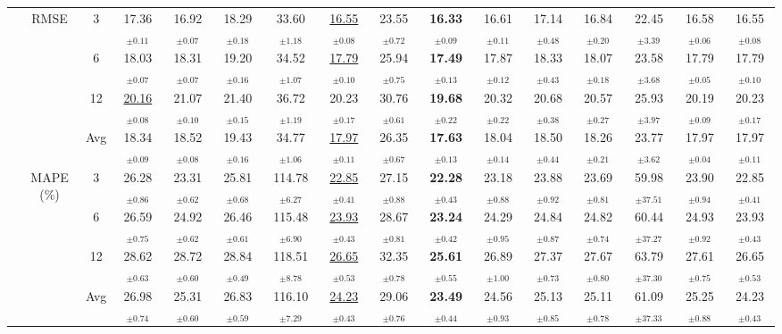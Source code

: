 \begin{table}[t]
{\begin{tabular}{ccc|ccc|cccc|cccc|cc}
\cmidrule(lr){2-16}
 & \multirow{4}{*}{RMSE} & 3 & 17.36$_{\pm0.11}$ & 16.92$_{\pm0.07}$ & 18.29$_{\pm0.18}$ & 33.60$_{\pm1.18}$ & \underline{16.55$_{\pm0.08}$} & 23.55$_{\pm0.72}$ & \textbf{16.33$_{\pm0.09}$} & 16.61$_{\pm0.11}$ & 17.14$_{\pm0.48}$ & 16.84$_{\pm0.20}$ & 22.45$_{\pm3.39}$ & 16.58$_{\pm0.06}$ & 16.55$_{\pm0.08}$ \\
 &  & 6 & 18.03$_{\pm0.07}$ & 18.31$_{\pm0.07}$ & 19.20$_{\pm0.16}$ & 34.52$_{\pm1.07}$ & \underline{17.79$_{\pm0.10}$} & 25.94$_{\pm0.75}$ & \textbf{17.49$_{\pm0.13}$} & 17.87$_{\pm0.12}$ & 18.33$_{\pm0.43}$ & 18.07$_{\pm0.18}$ & 23.58$_{\pm3.68}$ & 17.79$_{\pm0.05}$ & 17.79$_{\pm0.10}$ \\
 &  & 12 & \underline{20.16$_{\pm0.08}$} & 21.07$_{\pm0.10}$ & 21.40$_{\pm0.15}$ & 36.72$_{\pm1.19}$ & 20.23$_{\pm0.17}$ & 30.76$_{\pm0.61}$ & \textbf{19.68$_{\pm0.22}$} & 20.32$_{\pm0.22}$ & 20.68$_{\pm0.38}$ & 20.57$_{\pm0.27}$ & 25.93$_{\pm3.97}$ & 20.19$_{\pm0.09}$ & 20.23$_{\pm0.17}$ \\
 &  & Avg & 18.34$_{\pm0.09}$ & 18.52$_{\pm0.08}$ & 19.43$_{\pm0.16}$ & 34.77$_{\pm1.06}$ & \underline{17.97$_{\pm0.11}$} & 26.35$_{\pm0.67}$ & \textbf{17.63$_{\pm0.13}$} & 18.04$_{\pm0.14}$ & 18.50$_{\pm0.44}$ & 18.26$_{\pm0.21}$ & 23.77$_{\pm3.62}$ & 17.97$_{\pm0.04}$ & 17.97$_{\pm0.11}$ \\
\cmidrule(lr){2-16}
 & \multirow{4}{*}{MAPE (\%)} & 3 & 26.28$_{\pm0.86}$ & 23.31$_{\pm0.62}$ & 25.81$_{\pm0.68}$ & 114.78$_{\pm6.27}$ & \underline{22.85$_{\pm0.41}$} & 27.15$_{\pm0.88}$ & \textbf{22.28$_{\pm0.43}$} & 23.18$_{\pm0.88}$ & 23.88$_{\pm0.92}$ & 23.69$_{\pm0.81}$ & 59.98$_{\pm37.51}$ & 23.90$_{\pm0.94}$ & 22.85$_{\pm0.41}$ \\
 &  & 6 & 26.59$_{\pm0.75}$ & 24.92$_{\pm0.62}$ & 26.46$_{\pm0.61}$ & 115.48$_{\pm6.90}$ & \underline{23.93$_{\pm0.43}$} & 28.67$_{\pm0.81}$ & \textbf{23.24$_{\pm0.42}$} & 24.29$_{\pm0.95}$ & 24.84$_{\pm0.87}$ & 24.82$_{\pm0.74}$ & 60.44$_{\pm37.27}$ & 24.93$_{\pm0.92}$ & 23.93$_{\pm0.43}$ \\
 &  & 12 & 28.62$_{\pm0.63}$ & 28.72$_{\pm0.60}$ & 28.84$_{\pm0.49}$ & 118.51$_{\pm8.78}$ & \underline{26.65$_{\pm0.53}$} & 32.35$_{\pm0.78}$ & \textbf{25.61$_{\pm0.55}$} & 26.89$_{\pm1.00}$ & 27.37$_{\pm0.73}$ & 27.67$_{\pm0.80}$ & 63.79$_{\pm37.30}$ & 27.61$_{\pm0.75}$ & 26.65$_{\pm0.53}$ \\
 &  & Avg & 26.98$_{\pm0.74}$ & 25.31$_{\pm0.60}$ & 26.83$_{\pm0.59}$ & 116.10$_{\pm7.29}$ & \underline{24.23$_{\pm0.43}$} & 29.06$_{\pm0.76}$ & \textbf{23.49$_{\pm0.44}$} & 24.56$_{\pm0.93}$ & 25.13$_{\pm0.85}$ & 25.11$_{\pm0.78}$ & 61.09$_{\pm37.33}$ & 25.25$_{\pm0.88}$ & 24.23$_{\pm0.43}$ \\

\end{tabular}}
\end{table}
